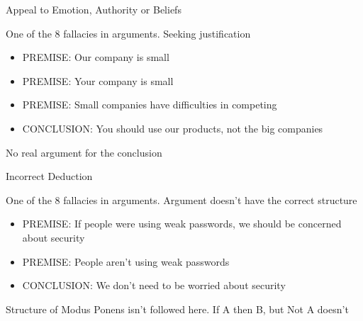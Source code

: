 \documentclass[]{../../DefinitionFormat}
\begin{document}
\begin{definition}{Appeal to Emotion, Authority or Beliefs}
	\begin{summary}
		One of the 8 fallacies in arguments. Seeking justification
	\end{summary}
		
	\begin{itemize}[label={}]
		\item PREMISE: Our company is small
		\item PREMISE: Your company is small
		\item PREMISE: Small companies have difficulties in competing
		\item CONCLUSION: You should use our products, not the big companies
	\end{itemize}	
	\par No real argument for the conclusion
\end{definition}

\begin{definition}{Incorrect Deduction}
	\begin{summary}
		One of the 8 fallacies in arguments. Argument doesn't have the correct structure
	\end{summary}
		\begin{itemize}[label={}]

		\item PREMISE: If people were using weak passwords, we should be concerned about security
		\item PREMISE: People aren't using weak passwords
		\item CONCLUSION: We don't need to be worried about security
			\end{itemize}	

	\par Structure of Modus Ponens isn't followed here. If A then B, but Not A doesn't 
\end{definition}
\end{document}
